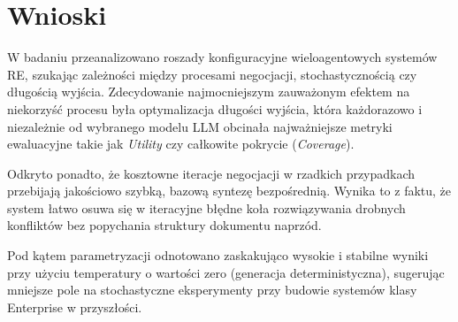 \documentclass[conference]{IEEEtran}
\begin{document}
\section{Wnioski}

W badaniu przeanalizowano roszady konfiguracyjne wieloagentowych systemów RE, szukając zależności między procesami negocjacji, stochastycznością czy długością wyjścia. Zdecydowanie najmocniejszym zauważonym efektem na niekorzyść procesu była optymalizacja długości wyjścia, która każdorazowo i niezależnie od wybranego modelu LLM obcinała najważniejsze metryki ewaluacyjne takie jak \textit{Utility} czy całkowite pokrycie (\textit{Coverage}).

Odkryto ponadto, że kosztowne iteracje negocjacji w rzadkich przypadkach przebijają jakościowo szybką, bazową syntezę bezpośrednią. Wynika to z faktu, że system łatwo osuwa się w iteracyjne błędne koła rozwiązywania drobnych konfliktów bez popychania struktury dokumentu naprzód.

Pod kątem parametryzacji odnotowano zaskakująco wysokie i stabilne wyniki przy użyciu temperatury o wartości zero (generacja deterministyczna), sugerując mniejsze pole na stochastyczne eksperymenty przy budowie systemów klasy Enterprise w przyszłości. 




\end{document}
